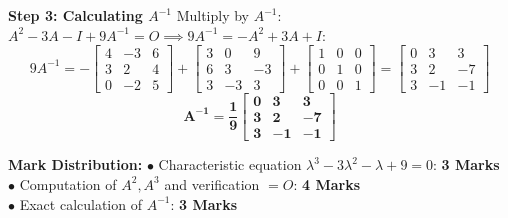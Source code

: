 \begin{solutionbox}
\textbf{Step 3: Calculating $A^{-1}$}
Multiply by $A^{-1}$: $A^2 - 3A - I + 9A^{-1} = O \implies 9A^{-1} = -A^2 + 3A + I$:
\[
9A^{-1} = -\begin{bmatrix} 4 & -3 & 6 \\ 3 & 2 & 4 \\ 0 & -2 & 5 \end{bmatrix} + \begin{bmatrix} 3 & 0 & 9 \\ 6 & 3 & -3 \\ 3 & -3 & 3 \end{bmatrix} + \begin{bmatrix} 1 & 0 & 0 \\ 0 & 1 & 0 \\ 0 & 0 & 1 \end{bmatrix} = \begin{bmatrix} 0 & 3 & 3 \\ 3 & 2 & -7 \\ 3 & -1 & -1 \end{bmatrix}
\]
\[
\mathbf{A^{-1} = \frac{1}{9}\begin{bmatrix} 0 & 3 & 3 \\ 3 & 2 & -7 \\ 3 & -1 & -1 \end{bmatrix}}
\]

\begin{markingrubric}
\textbf{Mark Distribution:}
$\bullet$ Characteristic equation $\lambda^3 - 3\lambda^2 - \lambda + 9 = 0$: \textbf{3 Marks}\\
$\bullet$ Computation of $A^2, A^3$ and verification $= O$: \textbf{4 Marks}\\
$\bullet$ Exact calculation of $A^{-1}$: \textbf{3 Marks}
\end{markingrubric}
\end{solutionbox}

